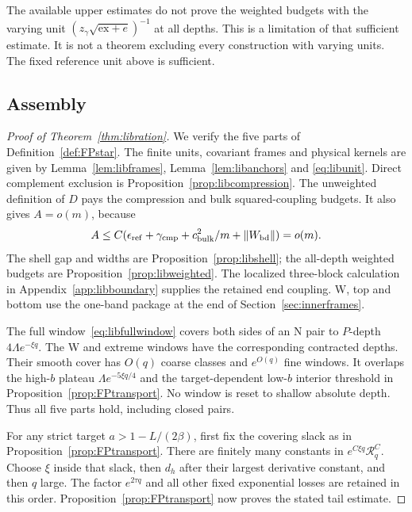 \begin{remark}\label{rem:libvarying}
The available upper estimates do not prove the weighted budgets
with the varying unit $(z_\gamma\sqrt{\mathrm{ex}+e})^{-1}$ at all
depths. This is a limitation of that sufficient estimate. It is not
a theorem excluding every construction with varying units.
The fixed reference unit above is sufficient.
\end{remark}

\subsection{Assembly}

\begin{proof}[Proof of Theorem~\ref{thm:libration}]
We verify the five parts of Definition~\ref{def:FPstar}.
The finite units, covariant frames and physical kernels are given
by Lemma~\ref{lem:libframes}, Lemma~\ref{lem:libanchors} and
\eqref{eq:libunit}. Direct complement exclusion is
Proposition~\ref{prop:libcompression}. The unweighted definition
of $D$ pays the compression and bulk squared-coupling budgets.
It also gives $A=o(m)$, because
\[
 A\le C(\epsilon_{\rm ref}+\gamma_{\rm cmp}
                 +c_{\rm bulk}^2/m+\|W_{\rm bd}\|)=o(m).
\]
The shell gap and widths are Proposition~\ref{prop:libshell}; the
all-depth weighted budgets are Proposition~\ref{prop:libweighted}.
The localized three-block calculation in
Appendix~\ref{app:libboundary} supplies the retained end coupling.
W, top and bottom use the one-band package at the end of
Section~\ref{sec:innerframes}.

The full window~\eqref{eq:libfullwindow} covers both sides of an N
pair to $P$-depth $4\Lambda e^{-\xi q}$. The W and extreme windows
have the corresponding contracted depths. Their smooth cover
has $O(q)$ coarse classes and $e^{O(q)}$ fine windows.
It overlaps the high-$b$ plateau $\Lambda e^{-5\xi q/4}$ and the
target-dependent low-$b$ interior threshold in
Proposition~\ref{prop:FPtransport}. No window is reset to shallow
absolute depth. Thus all five parts hold, including closed pairs.

For any strict target $a>1-L/(2\beta)$, first fix the covering slack
as in Proposition~\ref{prop:FPtransport}. There are finitely many
constants in $e^{C\xi q}\mathcal R_q^C$. Choose $\xi$ inside that
slack, then $d_h$ after their largest derivative constant, and then
$q$ large. The factor $e^{2\tau q}$ and all other fixed exponential
losses are retained in this order. Proposition~\ref{prop:FPtransport}
now proves the stated tail estimate.
\end{proof}

